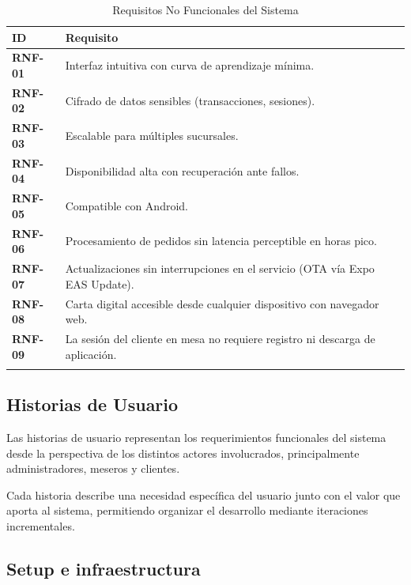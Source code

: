 \begin{longtable}{>{\bfseries}p{2cm} p{11cm}}
  \toprule
  \textbf{ID} & \textbf{Requisito} \\
  \midrule
  \endhead
  RNF-01 & Interfaz intuitiva con curva de aprendizaje mínima. \\[3pt]
  RNF-02 & Cifrado de datos sensibles (transacciones, sesiones). \\[3pt]
  RNF-03 & Escalable para múltiples sucursales. \\[3pt]
  RNF-04 & Disponibilidad alta con recuperación ante fallos. \\[3pt]
  RNF-05 & Compatible con Android. \\[3pt]
  RNF-06 & Procesamiento de pedidos sin latencia perceptible en horas pico. \\[3pt]
  RNF-07 & Actualizaciones sin interrupciones en el servicio (OTA vía Expo EAS Update). \\[3pt]
  RNF-08 & Carta digital accesible desde cualquier dispositivo con navegador web. \\[3pt]
  RNF-09 & La sesión del cliente en mesa no requiere registro ni descarga de aplicación. \\
  \bottomrule
  \caption{Requisitos No Funcionales del Sistema}
\end{longtable}

\subsection{Historias de Usuario}

Las historias de usuario representan los requerimientos funcionales del sistema
desde la perspectiva de los distintos actores involucrados, principalmente
administradores, meseros y clientes.

Cada historia describe una necesidad específica del usuario junto con el valor
que aporta al sistema, permitiendo organizar el desarrollo mediante iteraciones
incrementales.


\subsection{Setup e infraestructura}

